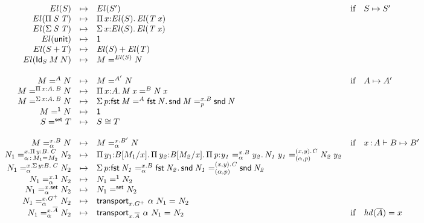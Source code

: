 \begin{small}
\[
\begin{array}{rclll}
\el{S} & \mapsto & \el{S'} & \text{if} & S \mapsto S' \\
\el{\picd{S}{T}} & \mapsto & \picl{x}{\el{S}}{\el{\app T x}} \\
\el{\sigmacd{S}{T}} & \mapsto & \sigmacl{x}{\el{S}}{\el{\app T x}} \\
\el{\unitcd} & \mapsto & \unit \\
\el{\smcd{S}{T}} & \mapsto & \sm{\el{S}}{\el{T}} \\
\el{\idcd{S}{M}{N}} & \mapsto & \iid{\el{S}}{M}{N} 
\\ \\

\iid{A}{M}{N} & \mapsto & \iid{A'}{M}{N} & \text{if} & A \mapsto A' \\
\iid{\picl{x}{A}{B}}{M}{N} & \mapsto & \picl{x}{A}{\iid{B}{\app M x}{\app N x}} & \\
\iid{\sigmacl{x}{A}{B}}{M}{N} & \mapsto & \sigmacl{p}{\iid{A}{\fst M}{\fst N}}{\iidover{x.B}{p}{\snd M}{\snd N}} & \\
\iid{\unit}{M}{N} & \mapsto & \unit \\
\iid{\set}{S}{T} & \mapsto & \equivset{S}{T} 
\\ \\

\iidover{x.B}{\alpha}{M}{N} & \mapsto & \iidover{x.B'}{\alpha}{M}{N} & \text{if} & \tptm{x}{A} \vdash B \mapsto B'\\
\iidover{x.\picl{y}{B}{C}}{\tptm{\alpha}{\iid{}{M_1}{M_2}}}{N_1}{N_2} & \mapsto
& \picl{y_1}{\subst{B}{M_1}{x}}{\picl{y_2}{\subst{B}{M_2}{x}}{\picl{p}{\iidover{x.B}{\alpha}{y_1}{y_2}}{\iidover{(x,y).C}{(\alpha,p)}{\app{N_1}{y_1}}{\app{N_2}{y_2}}}}} \\
\iidover{x.\sigmacl{y}{B}{C}}{\alpha}{N_1}{N_2} & \mapsto & \sigmacl{p}{\iidover{x.B}{\alpha}{\fst{N_1}}{\fst{N_2}}}{\iidover{(x,y).C}{(\alpha,p)}{\snd{N_1}}{\snd{N_2}}} \\
\iidover{x.\unit}{\alpha}{N_1}{N_2} & \mapsto & \iid{\unit}{N_1}{N_2} \\
\iidover{x.\set}{\alpha}{N_1}{N_2} & \mapsto & \iid{\set}{N_1}{N_2} \\
\iidover{x.G\ep}{\alpha}{N_1}{N_2} & \mapsto & \iid{}{\transport{x.G\ep}{\alpha}{N_1}}{N_2} \\
\iidover{x.\neu{A}}{\alpha}{N_1}{N_2} & \mapsto &
\iid{}{\transport{x.\neu{A}}{\alpha}{N_1}}{N_2} & \text{if} & \hd{\neu{A}} = x\\
\end{array}
\]
\end{small}

